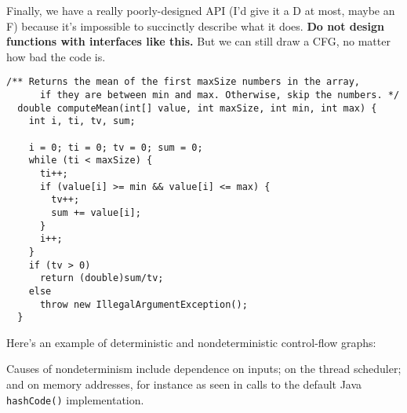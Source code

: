 \documentclass[11pt]{article}
\begin{document}
\newpage
Finally, we have a really poorly-designed API (I'd give it a D at most,
maybe an F) because it's impossible to succinctly describe what it
does. {\bf Do not design functions with interfaces like this.} But we
can still draw a CFG, no matter how bad the code is.
\begin{lstlisting}[basicstyle=\scriptsize\ttfamily]
  /** Returns the mean of the first maxSize numbers in the array,
      if they are between min and max. Otherwise, skip the numbers. */
  double computeMean(int[] value, int maxSize, int min, int max) {
    int i, ti, tv, sum;

    i = 0; ti = 0; tv = 0; sum = 0;
    while (ti < maxSize) {
      ti++;
      if (value[i] >= min && value[i] <= max) {
        tv++;
        sum += value[i];
      }
      i++;
    }
    if (tv > 0)
      return (double)sum/tv;
    else
      throw new IllegalArgumentException();
  }
\end{lstlisting}



Here's an example of deterministic and nondeterministic control-flow graphs:
\begin{center}
\end{center}
Causes of nondeterminism include dependence on inputs; on the thread
scheduler; and on memory addresses, for instance as seen in calls to 
the default Java {\tt hashCode()} implementation. 
\end{document}
